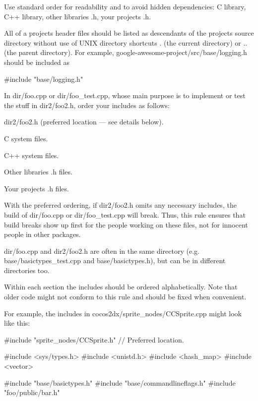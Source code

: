 Use standard order for readability and to avoid hidden dependencies\+: C library, C++ library, other libraries\textquotesingle{} .h, your project\textquotesingle{}s .h.

All of a project\textquotesingle{}s header files should be listed as descendants of the project\textquotesingle{}s source directory without use of U\+N\+IX directory shortcuts . (the current directory) or .. (the parent directory). For example, google-\/awesome-\/project/src/base/logging.\+h should be included as


\begin{DoxyCode}
\textcolor{preprocessor}{#include "base/logging.h"}
\end{DoxyCode}


In {\ttfamily dir/foo.\+cpp} or {\ttfamily dir/foo\+\_\+test.\+cpp}, whose main purpose is to implement or test the stuff in {\ttfamily dir2/foo2.\+h}, order your includes as follows\+:


\begin{DoxyItemize}
\item dir2/foo2.\+h (preferred location — see details below).
\item C system files.
\item C++ system files.
\item Other libraries\textquotesingle{} .h files.
\item Your project\textquotesingle{}s .h files.
\end{DoxyItemize}

With the preferred ordering, if {\ttfamily dir2/foo2.\+h} omits any necessary includes, the build of {\ttfamily dir/foo.\+cpp} or {\ttfamily dir/foo\+\_\+test.\+cpp} will break. Thus, this rule ensures that build breaks show up first for the people working on these files, not for innocent people in other packages.

{\ttfamily dir/foo.\+cpp} and {\ttfamily dir2/foo2.\+h} are often in the same directory (e.\+g. {\ttfamily base/basictypes\+\_\+test.\+cpp} and {\ttfamily base/basictypes.\+h}), but can be in different directories too.

Within each section the includes should be ordered alphabetically. Note that older code might not conform to this rule and should be fixed when convenient.

For example, the includes in {\ttfamily cocos2dx/sprite\+\_\+nodes/\+C\+C\+Sprite.\+cpp} might look like this\+:


\begin{DoxyCode}
\textcolor{preprocessor}{#include "sprite\_nodes/CCSprite.h"}  \textcolor{comment}{// Preferred location.}

\textcolor{preprocessor}{#include <sys/types.h>}
\textcolor{preprocessor}{#include <unistd.h>}
\textcolor{preprocessor}{#include <hash\_map>}
\textcolor{preprocessor}{#include <vector>}

\textcolor{preprocessor}{#include "base/basictypes.h"}
\textcolor{preprocessor}{#include "base/commandlineflags.h"}
\textcolor{preprocessor}{#include "foo/public/bar.h"}
\end{DoxyCode}


